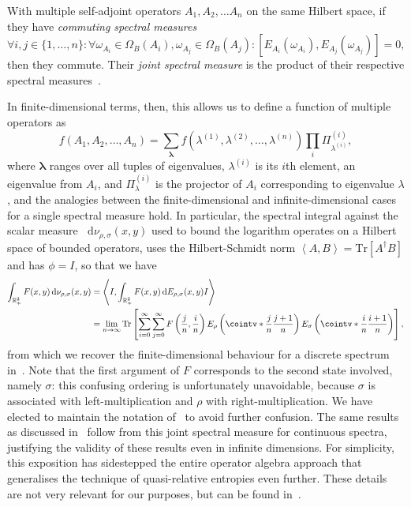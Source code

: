 \documentclass[10pt, a4paper]{article}
\numberwithin{equation}{section} %
\theoremstyle{definition}
\theoremstyle{plain}
\newcommand{\dif}{\mathop{}\!\mathrm{d}} %
\newcommand{\dintv}[2]{\mathopen\{#1,\ldots,#2\mathclose\}}
\newcommand{\?}{\mathrel{?}} %
\newcommand{\R}{\mathbb{R}} %
\newcommand{\cvec}[1]{\boldsymbol{\mathbf{#1}}}    %
\newcommand{\angleb}[1]{\left\langle #1 \right\rangle} %
\newcommand{\Tr}{\mathrm{Tr}} %
\begin{document}
\begin{appendices}
      With multiple self-adjoint operators \(A_1, A_2, \ldots A_n\) on the same Hilbert space, if they have \emph{commuting spectral measures}
      \[ \forall i, j \in \dintv{1}{n} : \forall \omega_{A_i} \in \Omega_B({A_i}), \omega_{A_j} \in \Omega_B({A_j}) : [E_{A_i}(\omega_{A_i}), E_{A_j}(\omega_{A_j})] = 0, \]
      then they commute. Their \emph{joint spectral measure} is the product of their respective spectral measures~\cite{SpectralTheoryQM}.

      In finite-dimensional terms, then, this allows us to define a function of multiple operators as
      \[f(A_1, A_2, \ldots, A_n) = \sum_{\cvec{\lambda}} f(\lambda^{(1)}, \lambda^{(2)}, \ldots, \lambda^{(n)}) \prod_i \Pi^{(i)}_{\lambda^{(i)}}, \]
      where \(\cvec{\lambda}\) ranges over all tuples of eigenvalues, \(\lambda^{(i)}\) is its \(i\)th element, an eigenvalue from \(A_i\), and \(\Pi^{(i)}_{\lambda}\) is the projector of \(A_i\) corresponding to eigenvalue \(\lambda\), and the analogies between the finite-dimensional and infinite-dimensional cases for a single spectral measure hold. In particular, the spectral integral against the scalar measure \(\dif{\nu_{\rho,\sigma}(x,y)}\) used to bound the logarithm operates on a Hilbert space of bounded operators, uses the Hilbert-Schmidt norm \(\angleb{A, B} = \Tr\left[A^{\dagger}B\right]\) and has \(\phi = I\), so that we have
      \begin{align*}
        \int_{\R_+^{2}} F(x,y) \dif{\nu_{\rho,\sigma}(x,y)} &= \angleb{I, \int_{\R_+^{2}} F(x,y) \dif{E_{\rho,\sigma}(x,y)} I} \\
                                                            &= \lim_{n\to\infty} \Tr\left[ \sum_{i=0}^{\infty}\sum_{j=0}^{\infty} F\left(\frac{j}{n}, \frac{i}{n}\right) E_{\rho}\left(\cointv*{\frac{j}{n}}{\frac{j+1}{n}}\right)
                                                            E_{\sigma}\left(\cointv*{\frac{i}{n}}{\frac{i+1}{n}}\right) \right],
      \end{align*}
      from which we recover the finite-dimensional behaviour for a discrete spectrum in~. Note that the first argument of \(F\) corresponds to the second state involved, namely \(\sigma\): this confusing ordering is unfortunately unavoidable, because \(\sigma\) is associated with left-multiplication and \(\rho\) with right-multiplication. We have elected to maintain the notation of~\cite{BFF_QRE} to avoid further confusion. The same results as discussed in~ follow from this joint spectral measure for continuous spectra, justifying the validity of these results even in infinite dimensions. For simplicity, this exposition has sidestepped the entire operator algebra approach that generalises the technique of quasi-relative entropies even further. These details are not very relevant for our purposes, but can be found in~\cite{BFF_QRE}.

    \end{appendices}

    
\end{document}
